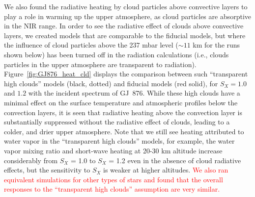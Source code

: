 \documentclass[11pt,numberedappendix,twocolappendix,]{emulateapj}
\def\wv{water vapor}
\def\addYF#1{\textcolor{red}{#1}}
\begin{document}
\color{black}


We also found the radiative heating by cloud particles above convective layers to play a role in warming up the upper atmosphere, as cloud particles are absorptive in the NIR range. 
In order to see the radiative effect of clouds above convective layers, we created models that are comparable to the fiducial models, but where the  influence of cloud particles above the 237 mbar level ($\sim 11$ km for the runs shown below) has been turned off in the radiation calculations (i.e., clouds particles in the upper atmosphere are transparent to radiation). 
Figure~\ref{fig:GJ876_heat_cld} displays the comparison between such ``transparent high clouds'' models (black, dotted) and fiducial models (red solid), for $S_X=1.0$ and $1.2$ with the incident spectrum of GJ~876. 
While these high clouds have a minimal effect on the surface temperature and atmospheric profiles below the convection layers, it is seen that radiative heating above the convection layer is substantially suppressed without the radiative effect of clouds, leading to a colder, and drier upper atmosphere. 
Note that we still see heating attributed to water vapor in the ``transparent high clouds'' models, for example, the \wv{} mixing ratio and short-wave heating at 20-30 km altitude increase considerably from $S_X$ = 1.0 to $S_X$ = 1.2 even in the absence of cloud radiative effects, but the sensitivity to $S_X$ is weaker at higher altitudes. 
\addYF{We also ran equivalent simulations for other types of stars and found that the overall responses to the ``transparent high clouds'' assumption are very similar.}
\end{document}
